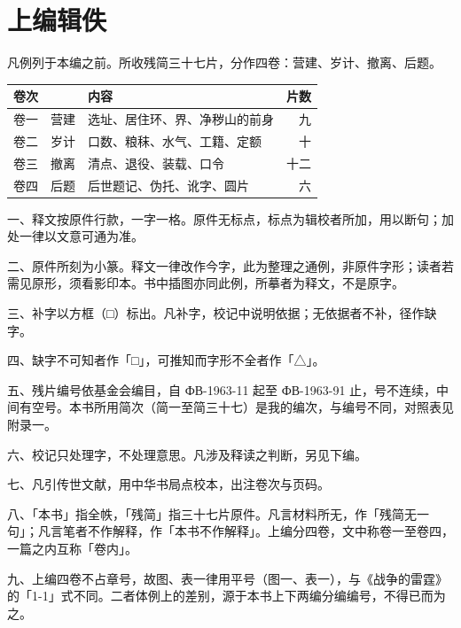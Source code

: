 \chapter*{上编\quad 辑佚}
{}

凡例列于本编之前。所收残简三十七片，分作四卷：营建、岁计、撤离、后题。

\begin{center}
\small
\begin{tabular}{@{}llr@{}}
\toprule
卷次 & 内容 & 片数\\
\midrule
卷一　营建 & 选址、居住环、界、净秽山的前身 & 九\\
卷二　岁计 & 口数、粮秣、水气、工籍、定额 & 十\\
卷三　撤离 & 清点、退役、装载、口令 & 十二\\
卷四　后题 & 后世题记、伪托、讹字、圆片 & 六\\
\bottomrule
\end{tabular}
\end{center}

\vspace{4mm}


一、释文按原件行款，一字一格。原件无标点，标点为辑校者所加，用以断句；加处一律以文意可通为准。

二、原件所刻为小篆。释文一律改作今字，此为整理之通例，非原件字形；读者若需见原形，须看影印本。书中插图亦同此例，所摹者为释文，不是原字。

三、补字以方框（□）标出。凡补字，校记中说明依据；无依据者不补，径作缺字。

四、缺字不可知者作「□」，可推知而字形不全者作「△」。

五、残片编号依基金会编目，自 ФВ-1963-11 起至 ФВ-1963-91 止，号不连续，中间有空号。本书所用简次（简一至简三十七）是我的编次，与编号不同，对照表见附录一。

六、校记只处理字，不处理意思。凡涉及释读之判断，另见下编。

七、凡引传世文献，用中华书局点校本，出注卷次与页码。

八、「本书」指全帙，「残简」指三十七片原件。凡言材料所无，作「残简无一句」；凡言笔者不作解释，作「本书不作解释」。上编分四卷，文中称卷一至卷四，一篇之内互称「卷内」。

九、上编四卷不占章号，故图、表一律用平号（图一、表一），与《战争的雷霆》的「1-1」式不同。二者体例上的差别，源于本书上下两编分编编号，不得已而为之。



